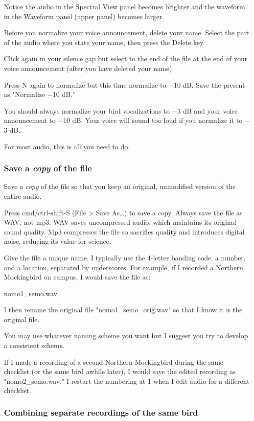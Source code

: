 \documentclass[12pt]{article}
\begin{document}
Notice the audio in the Spectral View panel becomes brighter and the waveform in the Waveform panel (upper panel) becomes larger. 

Before you normalize your voice announcement, delete your name. Select the part of the audio where you state your name, then press the Delete key.

Click again in your silence gap but select to the end of the file at the end of your voice announcement (after you have deleted your name). 

Press N again to normalize but this time normalize to $-$10 dB. Save the present as "Normalize $-$10 dB."

You should always normalize your bird vocalizations to $-$3 dB and your voice announcement to $-$10 dB. Your voice will sound too loud if you normalize it to $-$3 dB.

For most audio, this is all you need to do. 

\subsubsection*{Save a \emph{copy} of the file}

Save a \emph{copy} of the file so that you keep an original, unmodified version of the entire audio. 

Press cmd/ctrl-shift-S (File > Save As\ldots) to save a copy. Always save the file as WAV, not mp3. WAV saves uncompressed audio, which maintains its original sound quality. Mp3 compresses the file so sacrifies quality and introduces digital noise, reducing its value for science.

Give the file a unique name. I typically use the 4-letter banding code, a number, and a location, separated by underscores.  For example, if I recorded a Northern Mockingbird on campus, I would save the file as:

nomo1\_semo.wav

I then rename the original file "nomo1\_semo\_orig.wav" so that I know it is the original file.  

You may use whatever naming scheme you want but I suggest you try to develop a consistent scheme.

If I made a recording of a second Northern Mockingbird during the same checklist (or the same bird awhile later), I would save the edited recording as "nomo2\_semo.wav."  I restart the numbering at 1 when I edit audio for a different checklist.

\subsubsection*{Combining separate recordings of the same bird}
\end{document}
